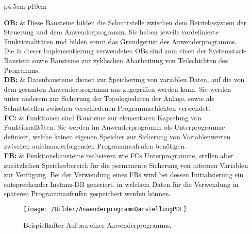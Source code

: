 			
			\begin{longtable}{{p{4.5cm} p{10cm}}}
				
				\textbf{\ac{OB}:} & Diese Bausteine bilden die Schnittstelle zwischen dem Betriebssystem der Steuerung und dem Anwenderprogramm. Sie haben jeweils vordefinierte Funktionalitäten und bilden somit das Grundgerüst des Anwenderprogramms. Die in dieser Implementierung verwendeten \ac{OB}s sind zum einen der Systemstart-Baustein sowie Bausteine zur zyklischen Abarbeitung von Teilschichten des Programms.\\[0.5cm]
				\textbf{\ac{DB}:} & Datenbausteine dienen zur Speicherung von variablen Daten, auf die von dem gesamten Anwenderprogramm  aus zugegriffen werden kann. Sie werden unter anderem zur Sicherung der Topologiedaten der Anlage, sowie als Schnittstellen zwischen verschiedenen Programmschichten verwendet.\\[0.5cm]
				\textbf{\ac{FC}:} & Funktionen sind Bausteine zur elementaren Kapselung von Funktionalitäten. Sie werden im Anwenderprogramm als Unterprogramme definiert, welche keinen eigenen Speicher zur Sicherung von Variablenwerten zwischen aufeinanderfolgenden Programmaufrufen benötigen.\\[0.5cm]
				\textbf{\ac{FB}:} & Funktionsbausteine realisieren wie \ac{FC}s Unterprogramme, stellen aber zusätzlichen Speicherbereich für die permanente Sicherung von internen Variablen zur Verfügung. Bei der Verwendung eines \ac{FB}s wird bei dessen Initialisierung ein entsprechender Instanz-\ac{DB} generiert, in welchem Daten für die Verwendung in späteren Programmaufrufen gespeichert werden können.\\[0.5cm]
				
			\end{longtable}
			
			\begin{figure}[h]
				\centering
				\texttt{[image: /Bilder/AnwenderprogrammDarstellungPDF]}
				\vspace{0.2cm}
				\caption{Beispielhafter Aufbau eines Anwenderprogramms.}\label{Anwenderprogramm Darstellung}
			\end{figure}
			
